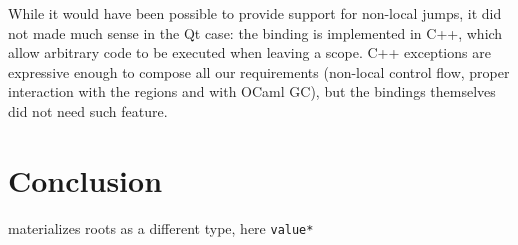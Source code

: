 \documentclass[a4paper]{easychair}
\begin{document}
While it would have been possible to provide support for non-local
jumps, it did not made much sense in the Qt case: the binding is
implemented in C++, which allow arbitrary code to be executed when
leaving a scope. C++ exceptions are expressive enough to compose all our
requirements (non-local control flow, proper interaction with the
regions and with OCaml GC), but the bindings themselves did not need
such feature.

\hypertarget{conclusion}{%
\section{Conclusion}\label{conclusion}}

materializes roots as a different type, here \texttt{value*}

\label{sect:bib}

\end{document}
